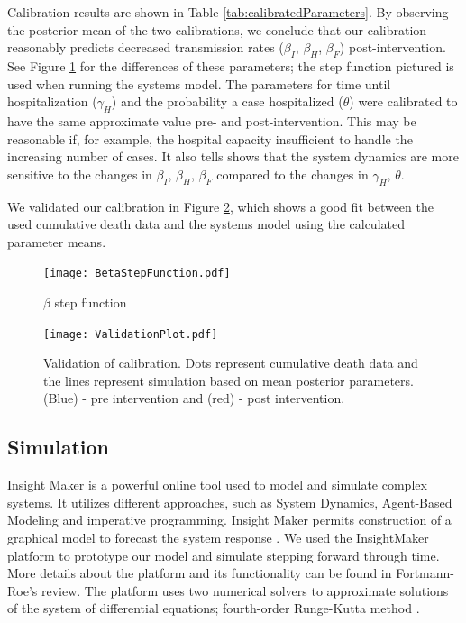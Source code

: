 Calibration results are shown in Table \ref{tab:calibratedParameters}. By observing the posterior mean of the two calibrations, we conclude that our calibration reasonably predicts decreased transmission rates ($\beta_I$, $\beta_H$, $\beta_F$) post-intervention. See Figure \ref{fig:BetaStepFunction} for the differences of these parameters; the step function pictured is used when running the systems model. The parameters for time until hospitalization ($\gamma_H$) and the probability a case hospitalized ($\theta$) were calibrated to have the same approximate value pre- and post-intervention. This may be reasonable if, for example, the hospital capacity  insufficient to handle the increasing number of cases. It also tells shows that the system dynamics are more sensitive to the changes in {$\beta_I$, $\beta_H$, $\beta_F$} compared to the changes in {$\gamma_H$, $\theta$}.


We validated our calibration in Figure \ref{fig:Cumulative _Death}, which shows a good fit between the used cumulative death data and the systems model using the calculated parameter means.


\begin{figure}[!h]
  \centering
  \texttt{[image: BetaStepFunction.pdf]}
  \caption{$\beta$ step function} 
\label{fig:BetaStepFunction} 
\end{figure}


\begin{figure}[h]
  \centering
  \texttt{[image: ValidationPlot.pdf]}
  \caption{Validation of calibration. Dots represent cumulative death data and the lines represent simulation based on mean posterior parameters. (Blue) - pre intervention and (red) - post intervention.}
\label{fig:Cumulative _Death}
\end{figure}




\subsection{Simulation}
 Insight Maker is a powerful online tool used to model and simulate complex systems. It utilizes different approaches, such as System Dynamics, Agent-Based Modeling and imperative programming. Insight Maker permits  construction of a graphical model to forecast the system response \cite{FortmannRoe}. We used the InsightMaker platform to prototype our model and simulate stepping forward through time. More details about the platform and its functionality can be found in Fortmann-Roe's review. The platform uses two numerical solvers to approximate solutions of the system of differential equations; fourth-order Runge-Kutta method \cite{FortmannRoe}.\\

